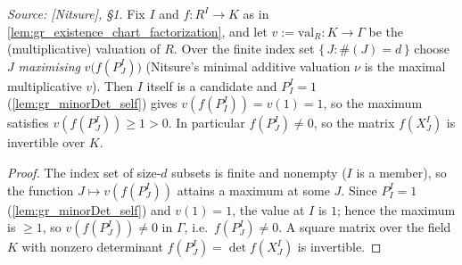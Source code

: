 \begin{lemma}\leanok
  \label{lem:gr_existence_minimal_valuation}
  \textit{Source: [Nitsure], \S 1.}
  Fix \(I\) and \(f : R^I \to K\) as in \cref{lem:gr_existence_chart_factorization},
  and let \(v := \mathrm{val}_R : K \to \Gamma\) be the (multiplicative) valuation
  of \(R\). Over the finite index set \(\{\, J : \#(J) = d \,\}\) choose \(J\)
  \emph{maximising} \(v\bigl(f(P^I_J)\bigr)\) (Nitsure's minimal additive valuation
  \(\nu\) is the maximal multiplicative \(v\)). Then \(I\) itself is a candidate and
  \(P^I_I = 1\) (\cref{lem:gr_minorDet_self}) gives \(v(f(P^I_I)) = v(1) = 1\), so
  the maximum satisfies \(v(f(P^I_J)) \ge 1 > 0\). In particular \(f(P^I_J) \ne 0\),
  so the matrix \(f(X^I_J)\) is invertible over \(K\).
\end{lemma}
\begin{proof}
  \leanok
  The index set of size-\(d\) subsets is finite and nonempty (\(I\) is a member),
  so the function \(J \mapsto v(f(P^I_J))\) attains a maximum at some \(J\). Since
  \(P^I_I = 1\) (\cref{lem:gr_minorDet_self}) and \(v(1) = 1\), the value at \(I\)
  is \(1\); hence the maximum is \(\ge 1\), so \(v(f(P^I_J)) \ne 0\) in \(\Gamma\),
  i.e.\ \(f(P^I_J) \ne 0\). A square matrix over the field \(K\) with nonzero
  determinant \(f(P^I_J) = \det f(X^I_J)\) is invertible.
\end{proof}

